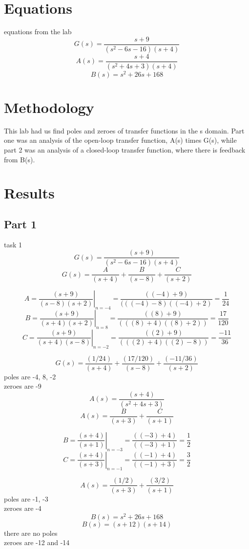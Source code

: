 \documentclass[12pt,a4paper]{article}
\begin{document}
\section{Equations}\label{sec:lit-rev}


equations from the lab
\[G(s) = \frac{s+9}{(s^2-6s-16)(s+4)}\]
\[A(s) = \frac{s+4}{(s^2+4s+3)(s+4)}\]
\[B(s) = s^2+26s+168\]

\section{Methodology}\label{sec:meth}
This lab had us find poles and zeroes of transfer functions in the s domain. Part one was an analysis of the open-loop transfer function, A(s) times G(s), while part 2 was an analysis of a closed-loop transfer function, where there is feedback from B(s). 

\section{Results}\label{sec:res}
\subsection*{Part 1}
task 1\\
\[G(s) = \frac {(s+9)}{(s^2-6s-16)(s+4)}\]
\[G(s) = \frac {A}{(s+4)} + \frac {B}{(s-8)} + \frac{C}{(s+2)}\]

\[A= \left . \frac {(s+9)}{(s-8)(s+2)} \right | _{n=-4} = \frac {((-4)+9)}{(((-4)-8)((-4)+2)} = \frac {1}{24}\]
\[B= \left . \frac {(s+9)}{(s+4)(s+2)} \right|_{n=8} = \frac {((8)+9)}{(((8)+4)((8)+2))} = \frac {17}{120}\]
\[C= \left . \frac {(s+9)}{(s+4)(s-8)} \right|_{n=-2} = \frac {((2)+9)}{(((2)+4)((2)-8))} = \frac {-11}{36}\]

\[G(s) = \frac {(1/24)}{(s+4)} + \frac {(17/120)}{(s-8)} + \frac {(-11/36)}{(s+2)}\]
poles are -4, 8, -2\\
zeroes are -9\\

\[A(s) = \frac {(s+4)}{(s^2+4s+3)}\]
\[A(s) = \frac {B}{(s+3)} + \frac {C}{(s+1)}\]

\[B=\left . \frac {(s+4)}{(s+1)} \right|_{n=-3} = \frac {((-3)+4)}{((-3)+1)} = \frac {1}{2}\]
\[C=\left . \frac {(s+4)}{(s+3)} \right|_{n=-1} = \frac {((-1)+4)}{((-1)+3)} = \frac {3}{2}\]

\[A(s) = \frac {(1/2)}{(s+3)} + \frac {(3/2)}{(s+1)}\]
poles are -1, -3\\
zeroes are -4 \\
\[B(s) = s^2+26s+168\]
\[B(s) = (s+12)(s+14)\]
there are no poles\\
zeroes are -12 and -14\\
\end{document}
